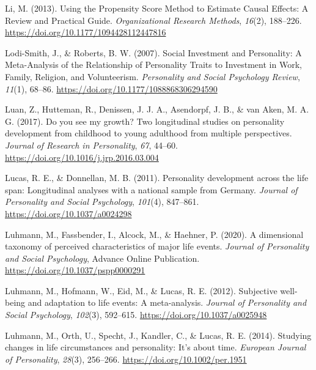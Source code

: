 \documentclass[
  english,
  man, noextraspace,floatsintext]{apa7}
\begin{document}
\leavevmode\hypertarget{ref-liUsingPropensityScore2013}{}%
Li, M. (2013). Using the Propensity Score Method to Estimate Causal Effects: A Review and Practical Guide. \emph{Organizational Research Methods}, \emph{16}(2), 188--226. \url{https://doi.org/10.1177/1094428112447816}

\leavevmode\hypertarget{ref-lodi-smithSocialInvestmentPersonality2007}{}%
Lodi-Smith, J., \& Roberts, B. W. (2007). Social Investment and Personality: A Meta-Analysis of the Relationship of Personality Traits to Investment in Work, Family, Religion, and Volunteerism. \emph{Personality and Social Psychology Review}, \emph{11}(1), 68--86. \url{https://doi.org/10.1177/1088868306294590}

\leavevmode\hypertarget{ref-luanYouSeeMy2017}{}%
Luan, Z., Hutteman, R., Denissen, J. J. A., Asendorpf, J. B., \& van Aken, M. A. G. (2017). Do you see my growth? Two longitudinal studies on personality development from childhood to young adulthood from multiple perspectives. \emph{Journal of Research in Personality}, \emph{67}, 44--60. \url{https://doi.org/10.1016/j.jrp.2016.03.004}

\leavevmode\hypertarget{ref-lucasPersonalityDevelopmentLife2011}{}%
Lucas, R. E., \& Donnellan, M. B. (2011). Personality development across the life span: Longitudinal analyses with a national sample from Germany. \emph{Journal of Personality and Social Psychology}, \emph{101}(4), 847--861. \url{https://doi.org/10.1037/a0024298}

\leavevmode\hypertarget{ref-luhmannDimensionalTaxonomyPerceived2020}{}%
Luhmann, M., Fassbender, I., Alcock, M., \& Haehner, P. (2020). A dimensional taxonomy of perceived characteristics of major life events. \emph{Journal of Personality and Social Psychology}, Advance Online Publication. \url{https://doi.org/10.1037/pspp0000291}

\leavevmode\hypertarget{ref-luhmannSubjectiveWellbeingAdaptation2012}{}%
Luhmann, M., Hofmann, W., Eid, M., \& Lucas, R. E. (2012). Subjective well-being and adaptation to life events: A meta-analysis. \emph{Journal of Personality and Social Psychology}, \emph{102}(3), 592--615. \url{https://doi.org/10.1037/a0025948}

\leavevmode\hypertarget{ref-luhmannStudyingChangesLife2014}{}%
Luhmann, M., Orth, U., Specht, J., Kandler, C., \& Lucas, R. E. (2014). Studying changes in life circumstances and personality: It's about time. \emph{European Journal of Personality}, \emph{28}(3), 256--266. \url{https://doi.org/10.1002/per.1951}
\end{document}
